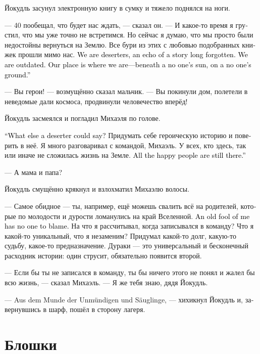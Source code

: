 \documentclass[a4paper,12pt,fleqn]{book}\usepackage{cooltooltips}\usepackage{polyglossia}\setdefaultlanguage[babelshorthands=true]{russian}\setotherlanguage{english}\defaultfontfeatures{Ligatures=TeX,Mapping=tex-text} \usepackage{xcolor}\definecolor{lightgray}{HTML}{bbbbbb}\color{lightgray}\newcommand{\ml}[3]{\textenglish{\textcolor{black}{#3}}}
\begin{document}
Йокудль засунул электронную книгу в сумку и тяжело поднялся на ноги.

--- 40 пообещал, что будет нас ждать, --- сказал он.
--- И какое-то время я грустил, что мы уже точно не встретимся.
Но сейчас я думаю, что мы просто были недостойны вернуться на Землю.
Все бури из этих с любовью подобранных книжек прошли мимо нас.
\ml{$0$}
{Мы --- дезертиры, отголосок давно забытой истории.}
{We are deserters, an echo of a story long forgotten.}
\ml{$0$}
{Мы устарели.}
{We are outdated.}
\ml{$0$}
{И наше место --- там, где мы есть, под ничьим солнцем, на ничьей земле.}
{Our place is where we are---beneath a no one's sun, on a no one's ground.''}

--- Вы герои! --- возмущённо сказал мальчик.
--- Вы покинули дом, полетели в неведомые дали космоса, продвинули человечество вперёд!

Йокудль засмеялся и погладил Михаэля по голове.

\ml{$0$}
{--- Что ещё может сделать дезертир?}
{``What else a deserter could say?}
Придумать себе героическую историю и поверить в неё.
Я много разговаривал с командой, Михаэль.
У всех, кто здесь, так или иначе не сложилась жизнь на Земле.
\ml{$0$}
{Все счастливые остались там.}
{All the happy people are still there.''}

--- А мама и папа?

Йокудль смущённо крякнул и взлохматил Михаэлю волосы.

--- Самое обидное --- ты, например, ещё можешь свалить всё на родителей, которые по молодости и дурости ломанулись на край Вселенной.
\ml{$0$}
{А мне, старому дураку, даже и винить некого.}
{An old fool of me has no one to blame.}
На что я рассчитывал, когда записывался в команду?
Что я какой-то уникальный, что я незаменим?
Придумал какой-то долг, какую-то судьбу, какое-то предназначение.
Дураки --- это универсальный и бесконечный расходник истории: один струсит, обязательно появится второй.

--- Если бы ты не записался в команду, ты бы ничего этого не понял и жалел бы всю жизнь, --- сказал Михаэль.
--- Я же тебя знаю, дядя Йокудль.

--- Aus dem Munde der Unmündigen und Säuglinge, --- хихикнул Йокудль и, завернувшись в шарф, пошёл в сторону лагеря.

\section{Блошки}
\end{document}
